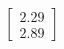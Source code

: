 \documentclass[preview]{standalone}
\begin{document}
\begin{align*}
\begin{bmatrix} 2.29 \\ 2.89 \end{bmatrix}
\end{align*}
\end{document}
